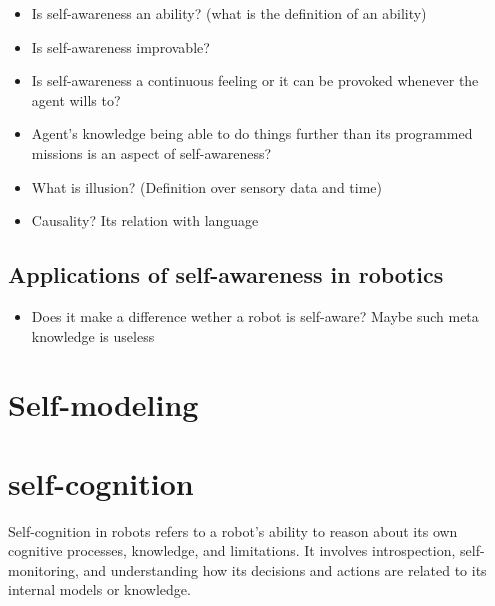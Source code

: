 \begin{itemize}
    \item Is self-awareness an ability? (what is the definition of an ability)
    \item Is self-awareness improvable?
    \item Is self-awareness a continuous feeling or it can be provoked whenever the agent wills to?
    \item Agent's knowledge being able to do things further than its programmed missions is an aspect of self-awareness?
    \item What is illusion? (Definition over sensory data and time)
    \item Causality? Its relation with language
\end{itemize}

\subsection{Applications of self-awareness in robotics}
\begin{itemize}
    \item Does it make a difference wether a robot is self-aware? Maybe such meta knowledge is useless
\end{itemize}


\section{Self-modeling}


\section{self-cognition}
Self-cognition in robots refers to a robot's ability to reason about its own cognitive processes, knowledge, and limitations. It involves introspection, self-monitoring, and understanding how its decisions and actions are related to its internal models or knowledge.

